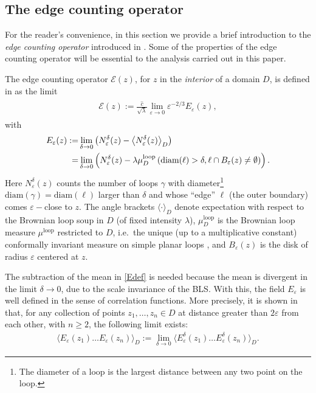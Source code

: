 \documentclass[a4paper,11pt]{article}
\begin{document}
\subsection{The edge counting operator} \label{sec:edge}

For the reader's convenience, in this section we provide a brief introduction to the \emph{edge counting operator} introduced in \cite{camia2021scalar}. Some of the properties of the edge counting operator will be essential to the analysis carried out in this paper.

The edge counting operator $\mathcal{E}(z)$, for $z$ in the \emph{interior} of a domain $D$, is  defined in \cite{camia2021scalar} as the limit
\begin{align}
\begin{split} \label{def:edge}
    {\mathcal E}(z) := \frac{\hat{c}}{\sqrt\lambda} \lim_{\varepsilon \to 0} \varepsilon^{-2/3} E_{\varepsilon}(z),
\end{split}
\end{align}
with
\begin{align}
\begin{split} \label{Edef}
    E_{\varepsilon}(z) := & \lim_{\delta \to 0} \left( N^{\delta}_{\varepsilon}(z) - \Braket{ N^{\delta}_{\varepsilon}(z) }_D \right) \\
    = & \lim_{\delta \to 0} \left( N^{\delta}_{\varepsilon}(z) - \lambda\mu^{\text{loop}}_D \left( \text{diam}(\ell)>\delta, \ell \cap B_{\varepsilon}(z) \neq \emptyset \right) \right).
\end{split}
\end{align}
Here $N^{\delta}_{\varepsilon}(z)$ counts the number of loops $\gamma$ with diameter\footnote{The diameter of a loop is the largest distance between any two point on the loop.} $\text{diam}(\gamma) = \text{diam}(\ell) $ larger than $\delta$ and  whose ``edge'' $\ell$ (the outer boundary) comes $\varepsilon-$close to $z$.  The angle brackets $\langle \cdot \rangle_D$ denote expectation with respect to the Brownian loop soup in $D$ (of fixed intensity $\lambda$),  $\mu^{\text{loop}}_D$ is the Brownian loop measure $\mu^{\text{loop}}$ restricted to $D$, i.e.\ the unique (up to a multiplicative constant) conformally invariant measure on simple planar loops \cite{2005math.....11605W}, and $B_{\varepsilon}(z)$ is the disk of radius $\varepsilon$ centered at $z$.

The subtraction of the mean in \eqref{Edef} is needed because the mean is divergent in the limit $\delta \to 0$, due to the scale invariance of the BLS. With this, the field $E_{\varepsilon}$ is well defined in the sense of correlation functions. More precisely, it is shown in \cite{camia2021scalar} that, for any collection of points $z_1,\ldots,z_n \in D$ at distance greater than $2\varepsilon$ from each other, with $n \geq 2$, the following limit exists:
\begin{align} \label{eq:E-correlations}
    \langle E_{\varepsilon}(z_1) \ldots E_{\varepsilon}(z_n) \rangle_D := \lim_{\delta \to 0} \langle E^{\delta}_{\varepsilon}(z_1) \ldots E^{\delta}_{\varepsilon}(z_n) \rangle_D .
\end{align}
\end{document}
